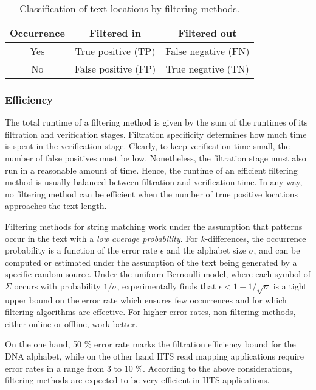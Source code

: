 \begin{table}[b]
\begin{center}
\caption[Classification of text locations by filtering methods]{Classification of text locations by filtering methods.}
\begin{tabular}{ccc}
\toprule
Occurrence & Filtered in & Filtered out\\
\midrule
Yes & True positive (TP) & False negative (FN) \\
No & False positive (FP) & True negative (TN) \\
\bottomrule
\end{tabular}
\label{tab:filter:accuracy}
\end{center}
\end{table}

\subsubsection{Efficiency}

The total runtime of a filtering method is given by the sum of the runtimes of its filtration and verification stages.
Filtration specificity determines how much time is spent in the verification stage.
Clearly, to keep verification time small, the number of false positives must be low.
Nonetheless, the filtration stage must also run in a reasonable amount of time.
Hence, the runtime of an efficient filtering method is usually balanced between filtration and verification time.
In any way, no filtering method can be efficient when the number of true positive locations approaches the text length.

Filtering methods for string matching work under the assumption that patterns occur in the text with a \emph{low average probability}.
For $k$-differences, the occurrence probability is a function of the error rate $\epsilon$ and the alphabet size $\sigma$, and can be computed or estimated under the assumption of the text being generated by a specific random source.
Under the uniform Bernoulli model, where each symbol of $\Sigma$ occurs with probability $1/\sigma$, \cite{Navarro2001a} experimentally finds that $\epsilon < 1 - 1 / \sqrt{\sigma}$ is a tight upper bound on the error rate which ensures few occurrences and for which filtering algorithms are effective.
For higher error rates, non-filtering methods, either online or offline, work better.

On the one hand, 50 \% error rate marks the filtration efficiency bound for the DNA alphabet, while on the other hand HTS read mapping applications require error rates in a range from 3 to 10 \%.
According to the above considerations, filtering methods are expected to be very efficient in HTS applications.

